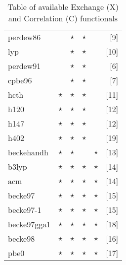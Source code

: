 \begin{table}[htp]
\begin{tabular}{|l|cccc|r|}
perdew86   &          &   $\star$     &  $\star$  &        &[9]\\
lyp        &          &   $\star$     &  $\star$  &        &[10]\\
perdew91   &          &   $\star$     &  $\star$  &        &[6]\\
cpbe96     &          &   $\star$     &  $\star$  &        &[7]\\
\hline                                                  
hcth       & $\star$    &   $\star$     &  $\star$  &        &[11]\\
h120       & $\star$    &   $\star$     &  $\star$  &        &[12]\\
h147       & $\star$    &   $\star$     &  $\star$  &        &[12]\\
h402       & $\star$    &   $\star$     &  $\star$  &        &[19]\\
\hline                                                  
beckehandh & $\star$    &   $\star$     &           & $\star$  &[13]\\
b3lyp      & $\star$    &   $\star$     &  $\star$  & $\star$  &[14]\\
acm        & $\star$    &   $\star$     &  $\star$  & $\star$  &[14]\\
becke97    & $\star$    &   $\star$     &  $\star$  & $\star$  &[15]\\
becke97-1  & $\star$    &   $\star$     &  $\star$  & $\star$  &[15]\\
becke97gga1  & $\star$    &   $\star$     &  $\star$  & $\star$  &[18]\\
becke98    & $\star$    &   $\star$     &  $\star$  & $\star$  &[16]\\
pbe0       & $\star$    &   $\star$     &  $\star$  & $\star$  &[17]\\
\hline
\end{tabular}
\caption{Table of available Exchange (X) and Correlation (C) functionals}
\end{table}
